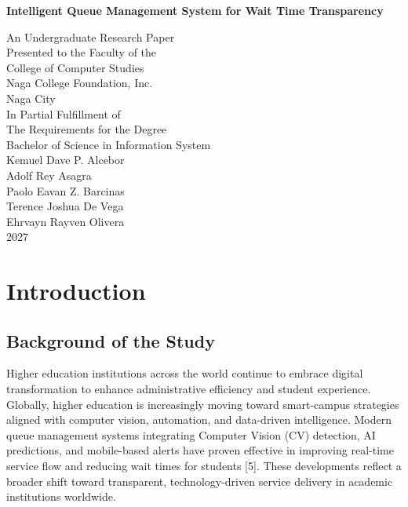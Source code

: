 \documentclass{research}
\title{}
\author{Fritzgerald Enric T. Imperial}
\begin{document}
\thispagestyle{empty}
\begin{center}
  \vspace*{1in}
  {\Huge\bfseries Intelligent Queue Management System for Wait Time Transparency \par}
  \vspace{1in}
  An Undergraduate Research Paper\\
  Presented to the Faculty of the\\
  College of Computer Studies\\
  Naga College Foundation, Inc.\\
  Naga City\\
  \vspace{1in}
  In Partial Fulfillment of\\
  The Requirements for the Degree\\
  Bachelor of Science in Information System\\
  \vspace{0.5in}
  Kemuel Dave P. Alcebor\\
  Adolf Rey Asagra\\
  Paolo Eavan Z. Barcinas\\
  Terence Joshua De Vega\\
  Ehrvayn Rayven Olivera\\
   \vspace*{0.8in}
  2027
\end{center}

\clearpage

\tableofcontents

\clearpage

\listoffigures

\clearpage

\listoftables

\clearpage

\clearpage

\chapter{Introduction}

\section{Background of the Study}

Higher education institutions across the world continue to embrace digital transformation to enhance administrative efficiency and student experience. Globally, higher education is increasingly moving toward smart-campus strategies aligned with computer vision, automation, and data-driven intelligence. Modern queue management systems integrating Computer Vision (CV) detection, AI predictions, and mobile-based alerts have proven effective in improving real-time service flow and reducing wait times for students [5]. These developments reflect a broader shift toward transparent, technology-driven service delivery in academic institutions worldwide.
\end{document}
